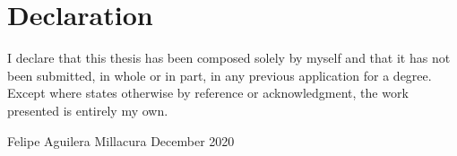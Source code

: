 \chapter{Declaration}
\vspace*{2\baselineskip}
 I declare that this thesis has been composed solely by myself and that it has not been submitted, in whole or in part, in any previous application for a degree. Except where states otherwise by reference or acknowledgment, the work presented is entirely my own.
\vspace{6\baselineskip}\\
\begin{flushright}
\hspace*{\fill}
Felipe Aguilera Millacura
\newline
December 2020
\end{flushright}


\cleardoublepage
